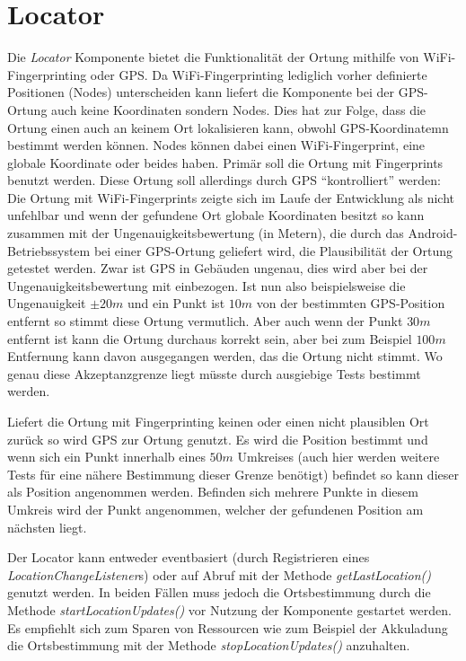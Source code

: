 \section{Locator}
Die \textit{Locator} Komponente bietet die Funktionalität der Ortung mithilfe von WiFi-Fingerprinting oder GPS. Da WiFi-Fingerprinting lediglich vorher definierte Positionen (Nodes) unterscheiden kann liefert die Komponente bei der GPS-Ortung auch keine Koordinaten sondern Nodes. Dies hat zur Folge, dass die Ortung einen auch an keinem Ort lokalisieren kann, obwohl GPS-Koordinatemn bestimmt werden können. Nodes können dabei einen WiFi-Fingerprint, eine globale Koordinate oder beides haben. Primär soll die Ortung mit Fingerprints benutzt werden. Diese Ortung soll allerdings durch GPS \enquote{kontrolliert} werden: Die Ortung mit WiFi-Fingerprints zeigte sich im Laufe der Entwicklung als nicht unfehlbar und wenn der gefundene Ort globale Koordinaten besitzt so kann zusammen mit der Ungenauigkeitsbewertung (in Metern), die durch das Android-Betriebssystem bei einer GPS-Ortung geliefert wird, die Plausibilität der Ortung getestet werden. Zwar ist GPS in Gebäuden ungenau, dies wird aber bei der Ungenauigkeitsbewertung mit einbezogen. Ist nun also beispielsweise die Ungenauigkeit $\pm20m$ und ein Punkt ist $10m$ von der bestimmten GPS-Position entfernt so stimmt diese Ortung vermutlich. Aber auch wenn der Punkt $30m$ entfernt ist kann die Ortung durchaus korrekt sein, aber bei zum Beispiel $100m$ Entfernung kann davon ausgegangen werden, das die Ortung nicht stimmt. Wo genau diese Akzeptanzgrenze liegt müsste durch ausgiebige Tests bestimmt werden.

Liefert die Ortung mit Fingerprinting keinen oder einen nicht plausiblen Ort zurück so wird GPS zur Ortung genutzt. Es wird die Position bestimmt und wenn sich ein Punkt innerhalb eines $50m$ Umkreises (auch hier werden weitere Tests für eine nähere Bestimmung dieser Grenze benötigt) befindet so kann dieser als Position angenommen werden. Befinden sich mehrere Punkte in diesem Umkreis wird der Punkt angenommen, welcher der gefundenen Position am nächsten liegt.

Der Locator kann entweder eventbasiert (durch Registrieren eines \textit{LocationChangeListener}s) oder auf Abruf mit der Methode \textit{getLastLocation()} genutzt werden. In beiden Fällen muss jedoch die Ortsbestimmung durch die Methode \textit{startLocationUpdates()} vor Nutzung der Komponente gestartet werden. Es empfiehlt sich zum Sparen von Ressourcen wie zum Beispiel der Akkuladung die Ortsbestimmung mit der Methode \textit{stopLocationUpdates()} anzuhalten.

